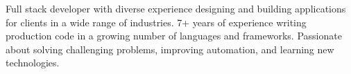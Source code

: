 

\begin{cvparagraph}

Full stack developer with diverse experience designing and building applications for clients in a wide range of industries. 7+ years of experience writing production code in a growing number of languages and frameworks. Passionate about solving challenging problems, improving \newline automation, and learning new technologies.
\end{cvparagraph}
